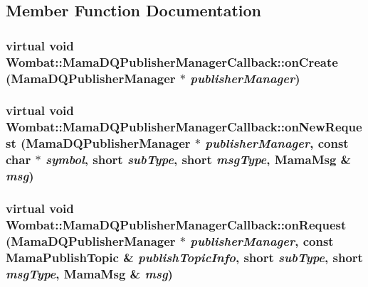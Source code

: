 \subsection{Member Function Documentation}
\hypertarget{classWombat_1_1MamaDQPublisherManagerCallback_a8ec11e1f59dc2754c0eef1d62d254136}{
\subsubsection[{onCreate}]{\setlength{\rightskip}{0pt plus 5cm}virtual void Wombat::MamaDQPublisherManagerCallback::onCreate ({\bf MamaDQPublisherManager} $\ast$ {\em publisherManager})}}
\label{classWombat_1_1MamaDQPublisherManagerCallback_a8ec11e1f59dc2754c0eef1d62d254136}
\hypertarget{classWombat_1_1MamaDQPublisherManagerCallback_a9eeeebfe0c18db07e39bd994796e0148}{
\subsubsection[{onNewRequest}]{\setlength{\rightskip}{0pt plus 5cm}virtual void Wombat::MamaDQPublisherManagerCallback::onNewRequest ({\bf MamaDQPublisherManager} $\ast$ {\em publisherManager}, \/  const char $\ast$ {\em symbol}, \/  short {\em subType}, \/  short {\em msgType}, \/  {\bf MamaMsg} \& {\em msg})}}
\label{classWombat_1_1MamaDQPublisherManagerCallback_a9eeeebfe0c18db07e39bd994796e0148}
\hypertarget{classWombat_1_1MamaDQPublisherManagerCallback_a965ba3cb09c848ec2e9b389758ede731}{
\subsubsection[{onRequest}]{\setlength{\rightskip}{0pt plus 5cm}virtual void Wombat::MamaDQPublisherManagerCallback::onRequest ({\bf MamaDQPublisherManager} $\ast$ {\em publisherManager}, \/  const {\bf MamaPublishTopic} \& {\em publishTopicInfo}, \/  short {\em subType}, \/  short {\em msgType}, \/  {\bf MamaMsg} \& {\em msg})}}

